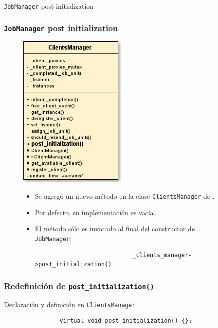 \begin{subsection}{\texttt{JobManager} post initialization}

	\begin{frame}[fragile]\frametitle{\texttt{JobManager} post initialization}
  		\begin{figure}[h] 		
    		\begin{minipage}{0.26 \textwidth}
      			\includegraphics[scale=0.5]{images/ClientsManager-post-init.png}
    		\end{minipage}
    		\hfill
    		\begin{minipage}{0.64 \textwidth}
      			\begin{block}{}
      				\begin{itemize}\addtolength{\itemsep}{6mm}
						\item Se agregó un nuevo método en la clase \texttt{ClientsManager} de \fud.
						\item Por defecto, su implementación es vacía.
						\item El método sólo es invocado al final del constructor de \texttt{JobManager}:
						\begin{lstlisting}
							_clients_manager->post_initialization()
						\end{lstlisting}
					\end{itemize}
      			\end{block}
      		\end{minipage}
      	\end{figure}
	\end{frame}
	
	\begin{frame}[fragile]\frametitle{Redefinición de \texttt{post\_initialization()}}
		\begin{block}{Declaración y definición en \texttt{ClientsManager}}
			\begin{lstlisting}
				virtual void post_initialization() {};
			\end{lstlisting}
		\end{block}
		

\end{frame}
\end{subsection}
